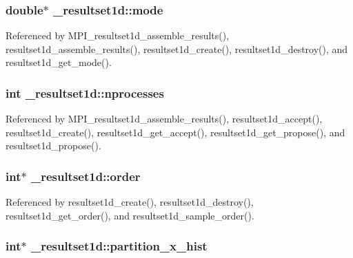 \subsubsection[{\texorpdfstring{mode}{mode}}]{\setlength{\rightskip}{0pt plus 5cm}double$\ast$ \+\_\+resultset1d\+::mode}\hypertarget{struct__resultset1d_af94dbf778f066ba031edba593bfd51ff}{}\label{struct__resultset1d_af94dbf778f066ba031edba593bfd51ff}


Referenced by M\+P\+I\+\_\+resultset1d\+\_\+assemble\+\_\+results(), resultset1d\+\_\+assemble\+\_\+results(), resultset1d\+\_\+create(), resultset1d\+\_\+destroy(), and resultset1d\+\_\+get\+\_\+mode().

\subsubsection[{\texorpdfstring{nprocesses}{nprocesses}}]{\setlength{\rightskip}{0pt plus 5cm}int \+\_\+resultset1d\+::nprocesses}\hypertarget{struct__resultset1d_ad283326b9422a787013d772dcdde7815}{}\label{struct__resultset1d_ad283326b9422a787013d772dcdde7815}


Referenced by M\+P\+I\+\_\+resultset1d\+\_\+assemble\+\_\+results(), resultset1d\+\_\+accept(), resultset1d\+\_\+create(), resultset1d\+\_\+get\+\_\+accept(), resultset1d\+\_\+get\+\_\+propose(), and resultset1d\+\_\+propose().

\subsubsection[{\texorpdfstring{order}{order}}]{\setlength{\rightskip}{0pt plus 5cm}int$\ast$ \+\_\+resultset1d\+::order}\hypertarget{struct__resultset1d_a320c541fe9f8dacfd40506e1a3b8cbee}{}\label{struct__resultset1d_a320c541fe9f8dacfd40506e1a3b8cbee}


Referenced by resultset1d\+\_\+create(), resultset1d\+\_\+destroy(), resultset1d\+\_\+get\+\_\+order(), and resultset1d\+\_\+sample\+\_\+order().

\subsubsection[{\texorpdfstring{partition\+\_\+x\+\_\+hist}{partition_x_hist}}]{\setlength{\rightskip}{0pt plus 5cm}int$\ast$ \+\_\+resultset1d\+::partition\+\_\+x\+\_\+hist}\hypertarget{struct__resultset1d_a7fdc65f3948298239e99392ec94a7201}{}\label{struct__resultset1d_a7fdc65f3948298239e99392ec94a7201}



